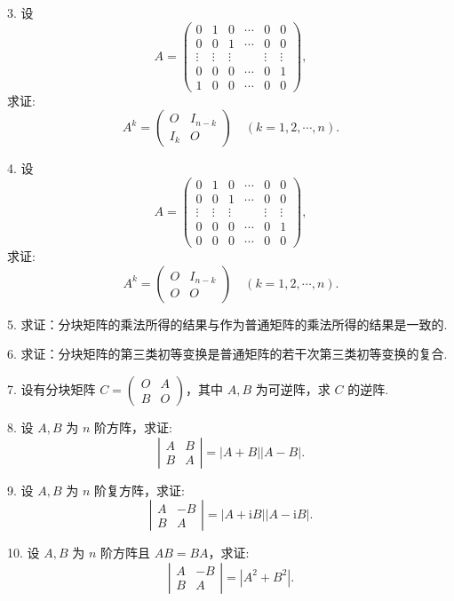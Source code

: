 \documentclass[UTF8, 12pt, fontset=fandol, oneside]{ctexart}
\begin{document}
3. 设
\[
A=\left(\begin{array}{cccccc}
0 & 1 & 0 & \cdots & 0 & 0\\
0 & 0 & 1 & \cdots & 0 & 0\\
\vdots & \vdots & \vdots & & \vdots & \vdots\\
0 & 0 & 0 & \cdots & 0 & 1\\
1 & 0 & 0 & \cdots & 0 & 0
\end{array}\right),
\]
求证:
\[
A^k=\left(\begin{array}{cc}
O & I_{n-k}\\
I_k & O
\end{array}\right)\quad (k=1,2,\cdots,n).
\]

4. 设
\[
A=\left(\begin{array}{cccccc}
0 & 1 & 0 & \cdots & 0 & 0\\
0 & 0 & 1 & \cdots & 0 & 0\\
\vdots & \vdots & \vdots & & \vdots & \vdots\\
0 & 0 & 0 & \cdots & 0 & 1\\
0 & 0 & 0 & \cdots & 0 & 0
\end{array}\right),
\]
求证:
\[
A^k=\left(\begin{array}{cc}
O & I_{n-k}\\
O & O
\end{array}\right)\quad (k=1,2,\cdots,n).
\]

5. 求证：分块矩阵的乘法所得的结果与作为普通矩阵的乘法所得的结果是一致的.

6. 求证：分块矩阵的第三类初等变换是普通矩阵的若干次第三类初等变换的复合.

7. 设有分块矩阵 $C=\left(\begin{array}{cc}O&A\\ B&O\end{array}\right)$，其中 $A,B$ 为可逆阵，求 $C$ 的逆阵.

8. 设 $A,B$ 为 $n$ 阶方阵，求证:
\[
\left|\begin{array}{cc}
A & B\\
B & A
\end{array}\right|=|A+B||A-B|.
\]

9. 设 $A,B$ 为 $n$ 阶复方阵，求证:
\[
\left|\begin{array}{cc}
A & -B\\
B & A
\end{array}\right|=|A+\mathrm{i}B||A-\mathrm{i}B|.
\]

10. 设 $A,B$ 为 $n$ 阶方阵且 $AB=BA$，求证:
\[
\left|\begin{array}{cc}
A & -B\\
B & A
\end{array}\right|=|A^2+B^2|.
\]
\end{document}
